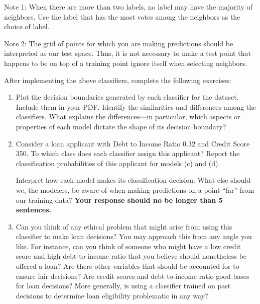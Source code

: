 \documentclass[submit]{harvardml}
\begin{document}
\begin{problem}
\begin{enumerate}[label=\alph*)]
        Note 1: When there are more than two labels, no label may have the
        majority of neighbors.  Use the label that has the most votes among
        the neighbors as the choice of label.

        Note 2: The grid of points for which you are making predictions
        should be interpreted as our test space.  Thus, it is not necessary
        to make a test point that happens to be on top of a training point
        ignore itself when selecting neighbors.

\end{enumerate}

After implementing the above classifiers, complete the following exercises:
  \begin{enumerate}



      \item Plot the decision boundaries generated by each classifier for the dataset. Include them in your PDF.
            Identify the similarities and differences among the classifiers. What explains the differences---in particular, which aspects or properties of each model dictate the shape of its decision boundary?
    
      \item
    
            Consider a loan applicant with Debt to Income Ratio 0.32 and Credit Score 350. To which class does each classifier assign this applicant? Report the classification probabilities of this applicant for models (c) and (d).
            
            Interpret how each model makes its classification decision. What else should we, the modelers, be aware of when making predictions on a point “far” from our training data? \textbf{Your response should no be longer than 5 sentences.}

    \item
        Can you think of any ethical problem that might arise from using this classifier to make loan decisions? You may approach this from any angle you like. For instance, can you think of someone who might have a low credit score and high debt-to-income ratio that you believe should nonetheless be offered a loan? Are there other variables that should be accounted for to ensure fair decisions? Are credit scores and debt-to-income ratio good bases for loan decisions? More generally, is using a classifier trained on past decisions to determine loan eligibility problematic in any way?
    \end{enumerate}
\end{problem}
\end{document}
